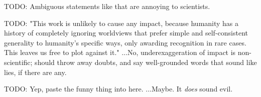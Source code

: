 \documentclass{article}
\begin{document}
    TODO: Ambiguous statements like that are annoying to scientists.

    TODO: "This work is unlikely to cause any impact, because humanity has a history of completely ignoring worldviews that prefer simple and self-consistent generality to humanity's specific ways, only awarding recognition in rare cases. This leaves us free to plot against it." ...No, underexaggeration of impact is non-scientific; should throw away doubts, and say well-grounded words that sound like lies, if there are any.

    TODO: Yep, paste the funny thing into here. ...Maybe. It \textit{does} sound evil.

\printbibliography
\end{document}

